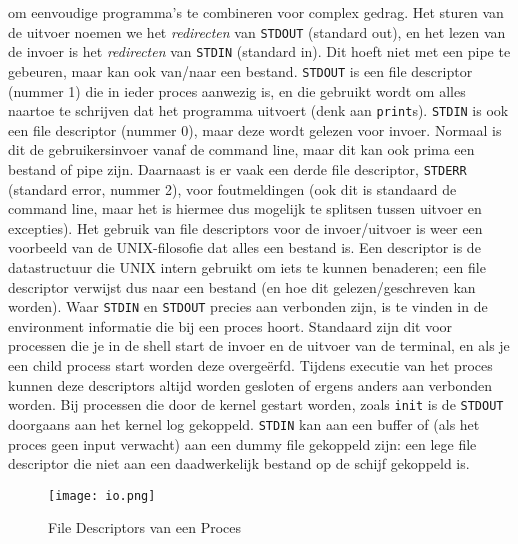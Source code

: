  om eenvoudige programma's te combineren voor complex gedrag. Het sturen van de uitvoer noemen we het \emph{redirecten} van \texttt{STDOUT} (standard out), en het lezen van de invoer is het \emph{redirecten} van \texttt{STDIN} (standard in). Dit hoeft niet met een pipe te gebeuren, maar kan ook van/naar een bestand. \texttt{STDOUT} is een file descriptor (nummer 1) die in ieder proces aanwezig is, en die gebruikt wordt om alles naartoe te schrijven dat het programma uitvoert (denk aan \texttt{print}s). \texttt{STDIN} is ook een file descriptor (nummer 0), maar deze wordt gelezen voor invoer. Normaal is dit de gebruikersinvoer vanaf de command line, maar dit kan ook prima een bestand of pipe zijn. Daarnaast is er vaak een derde file descriptor, \texttt{STDERR} (standard error, nummer 2), voor foutmeldingen (ook dit is standaard de command line, maar het is hiermee dus mogelijk te splitsen tussen uitvoer en excepties). Het gebruik van file descriptors voor de invoer/uitvoer is weer een voorbeeld van de UNIX-filosofie dat alles een bestand is. Een descriptor is de datastructuur die UNIX intern gebruikt om iets te kunnen benaderen; een file descriptor verwijst dus naar een bestand (en hoe dit gelezen/geschreven kan worden). Waar \texttt{STDIN} en \texttt{STDOUT} precies aan verbonden zijn, is te vinden in de environment informatie die bij een proces hoort. Standaard zijn dit voor processen die je in de shell start de invoer en de uitvoer van de terminal, en als je een child process start worden deze overgeërfd. Tijdens executie van het proces kunnen deze descriptors altijd worden gesloten of ergens anders aan verbonden worden. Bij processen die door de kernel gestart worden, zoals \texttt{init} is de \texttt{STDOUT} doorgaans aan het kernel log gekoppeld. \texttt{STDIN} kan aan een buffer of (als het proces geen input verwacht) aan een dummy file gekoppeld zijn: een lege file descriptor die niet aan een daadwerkelijk bestand op de schijf gekoppeld is.

\begin{figure}[ht]
    \centering
    \texttt{[image: io.png]}
    \caption{File Descriptors van een Proces}
    \label{fig:process-io}
\end{figure}

